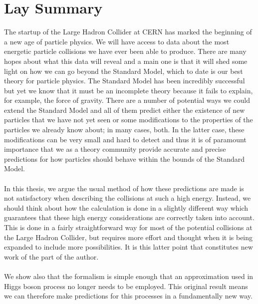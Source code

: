 \chapter*{Lay Summary}

\noindent

\normalsize

The startup of the Large Hadron Collider at CERN has marked the beginning of a new age of particle physics. We will have access to data about the most energetic particle collisions we have ever been able to produce. There are many hopes about what this data will reveal and a main one is that it will shed some light on how we can go beyond the Standard Model, which to date is our best theory for particle physics. The Standard Model has been incredibly successful but yet we know that it must be an incomplete theory because it fails to explain, for example, the force of gravity. There are a number of potential ways we could extend the Standard Model and all of them predict either the existence of new particles that we have not yet seen or some modifications to the properties of the particles we already know about; in many cases, both. In the latter case, these modifications can be very small and hard to detect and thus it is of paramount importance that we as a theory community provide accurate and precise predictions for how particles should behave within the bounds of the Standard Model. \\
\\
In this thesis, we argue the usual method of how these predictions are made is not satisfactory when describing the collisions at such a high energy. Instead, we should think about how the calculation is done in a slightly different way which guarantees that these high energy considerations are correctly taken into account. This is done in a fairly straightforward way for most of the potential collisions at the Large Hadron Collider, but requires more effort and thought when it is being expanded to include more possibilities. It is this latter point that constitutes new work of the part of the author. \\
\\
We show also that the formalism is simple enough that an approximation used in Higgs boson process no longer needs to be employed. This original result means we can therefore make predictions for this processes in a fundamentally new way. 

